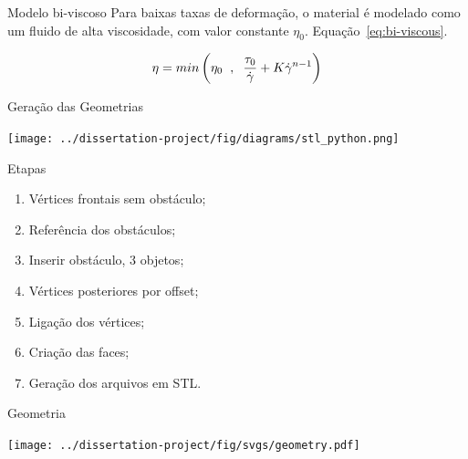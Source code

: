 \begin{frame}{Modelo bi-viscoso}
    Para baixas taxas de deformação, o material é modelado como um fluido de alta viscosidade, com valor constante $\eta_0$. Equação~\ref{eq:bi-viscous}.

    \begin{equation} \label{eq:bi-viscous}
        \eta = min \left( \eta_0 \hspace{0.2cm} , \hspace{0.2cm} \frac{\tau_0}{\dot{\gamma}} + K\dot{\gamma}^{n-1}  \right)
    \end{equation}

\end{frame}

\begin{frame}{Geração das Geometrias}
    \begin{minipage}[c]{0.55\textwidth}
        \centering
        \texttt{[image: ../dissertation-project/fig/diagrams/stl\_python.png]}
    \end{minipage}
    \hfill
    \begin{minipage}[c]{0.43\textwidth}
        \begin{exampleblock}{Etapas}
            \begin{enumerate}
                \item Vértices frontais sem obstáculo; \pause
                \item Referência dos obstáculos; \pause
                \item Inserir obstáculo, 3 objetos; \pause
                \item Vértices posteriores por offset; \pause
                \item Ligação dos vértices; \pause
                \item Criação das faces; \pause
                \item Geração dos arquivos em STL.
            \end{enumerate}
        \end{exampleblock}
    \end{minipage}
    \end{frame}


\begin{frame}{Geometria}
    \begin{minipage}[c]{0.58\textwidth}
        \texttt{[image: ../dissertation-project/fig/svgs/geometry.pdf]}
    \end{minipage}
    \hfill
    \begin{minipage}[c]{0.38\textwidth}
    \end{minipage}
\end{frame}


